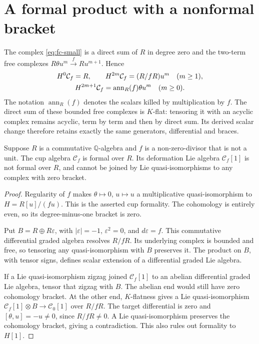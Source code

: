 \section{A formal product with a nonformal bracket}

The complex \eqref{eq:fc-small} is a direct sum of \(R\) in degree
zero and the two-term free complexes
\(R\theta u^m\xrightarrow{f}Ru^{m+1}\). Hence
\begin{gather}\label{eq:fc-cohomology}
 H^0\mathcal C_f=R,\qquad
 H^{2m}\mathcal C_f=(R/fR)u^m\quad(m\geq1),\\
 H^{2m+1}\mathcal C_f=\operatorname{ann}_R(f)\theta u^m
 \quad(m\geq0).\notag
\end{gather}
The notation \(\operatorname{ann}_R(f)\) denotes the scalars killed
by multiplication by \(f\). The direct sum of these bounded free
complexes is \(K\)-flat: tensoring it with an acyclic complex remains
acyclic, term by term and then by direct sum. Its derived scalar change
therefore retains exactly the same generators, differential and braces.

\begin{theorem}\label{thm:fc-nonformal}
Suppose \(R\) is a commutative \(\mathbb Q\)-algebra and \(f\) is
a non-zero-divisor that is not a unit. The cup algebra
\(\mathcal C_f\) is formal over \(R\). Its deformation Lie algebra
\(\mathcal C_f[1]\) is not formal over \(R\), and cannot be joined
by Lie quasi-isomorphisms to any complex with zero bracket.
\end{theorem}
\begin{proof}
Regularity of \(f\) makes \(\theta\mapsto0\), \(u\mapsto u\)
a multiplicative quasi-isomorphism to \(H=R[u]/(fu)\).
This is the asserted cup formality. The cohomology is entirely even,
so its degree-minus-one bracket is zero.

Put \(B=R\oplus R\varepsilon\), with \(|\varepsilon|=-1\),
\(\varepsilon^2=0\), and \(d\varepsilon=f\). This commutative
differential graded algebra resolves \(R/fR\). Its underlying complex
is bounded and free, so tensoring any quasi-isomorphism with \(B\)
preserves it. The product on \(B\), with tensor signs, defines scalar
extension of a differential graded Lie algebra.

If a Lie quasi-isomorphism zigzag joined \(\mathcal C_f[1]\) to an
abelian differential graded Lie algebra, tensor that zigzag with
\(B\). The abelian end would still have zero cohomology bracket.
At the other end, \(K\)-flatness gives a Lie quasi-isomorphism
\(\mathcal C_f[1]\otimes B\to\mathcal C_0[1]\) over \(R/fR\).
The target differential is zero and
\([\theta,u]=-u\ne0\), since \(R/fR\ne0\).
A Lie quasi-isomorphism preserves the cohomology bracket, giving a
contradiction. This also rules out formality to \(H[1]\).
\end{proof}

